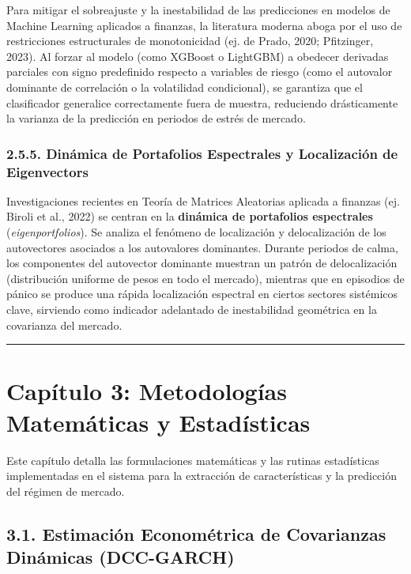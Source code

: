 \documentclass[
  12pt,
]{article}
\begin{document}
Para mitigar el sobreajuste y la inestabilidad de las predicciones en
modelos de Machine Learning aplicados a finanzas, la literatura moderna
aboga por el uso de restricciones estructurales de monotonicidad (ej. de
Prado, 2020; Pfitzinger, 2023). Al forzar al modelo (como XGBoost o
LightGBM) a obedecer derivadas parciales con signo predefinido respecto
a variables de riesgo (como el autovalor dominante de correlación o la
volatilidad condicional), se garantiza que el clasificador generalice
correctamente fuera de muestra, reduciendo drásticamente la varianza de
la predicción en periodos de estrés de mercado.

\subsubsection{2.5.5. Dinámica de Portafolios Espectrales y Localización
de
Eigenvectors}\label{dinuxe1mica-de-portafolios-espectrales-y-localizaciuxf3n-de-eigenvectors}

Investigaciones recientes en Teoría de Matrices Aleatorias aplicada a
finanzas (ej. Biroli et al., 2022) se centran en la \textbf{dinámica de
portafolios espectrales} (\emph{eigenportfolios}). Se analiza el
fenómeno de localización y delocalización de los autovectores asociados
a los autovalores dominantes. Durante periodos de calma, los componentes
del autovector dominante muestran un patrón de delocalización
(distribución uniforme de pesos en todo el mercado), mientras que en
episodios de pánico se produce una rápida localización espectral en
ciertos sectores sistémicos clave, sirviendo como indicador adelantado
de inestabilidad geométrica en la covarianza del mercado.

\begin{center}\rule{0.5\linewidth}{0.5pt}\end{center}

\section{Capítulo 3: Metodologías Matemáticas y
Estadísticas}\label{capuxedtulo-3-metodologuxedas-matemuxe1ticas-y-estaduxedsticas}

Este capítulo detalla las formulaciones matemáticas y las rutinas
estadísticas implementadas en el sistema para la extracción de
características y la predicción del régimen de mercado.

\subsection{3.1. Estimación Econométrica de Covarianzas Dinámicas
(DCC-GARCH)}\label{estimaciuxf3n-economuxe9trica-de-covarianzas-dinuxe1micas-dcc-garch}
\end{document}

